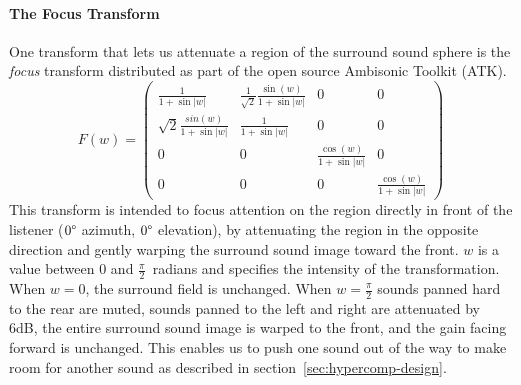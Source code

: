 \paragraph{The Focus Transform} One transform that lets us attenuate a
region of the surround sound sphere is the \textit{focus} transform
distributed as part of the open source Ambisonic Toolkit
(ATK).\cite{Anderson2009}
\begin{equation}
F(w)=\left( \begin{array}{cccc}
\frac{1}{1 + \sin|w|} & 
\frac{1}{\sqrt{2}} \frac{\sin(w)}{1 + \sin|w|}  & 
0 &
0 \\
\sqrt{2}\frac{sin(w)}{1 + \sin|w|} & %
\frac{1}{1 + \sin|w|} &                    %
0 & 
0 \\
0 & 
0 &
\frac{\cos(w)}{1 + \sin|w|} &
0 \\
0 &
0 &
0 &
\frac{\cos(w)}{1 + \sin|w|} 
\end{array} \right)
\label{eq:focus}
\end{equation}
This transform is intended to focus attention on the region directly
in front of the listener ($0\degree$ azimuth, $0\degree$ elevation),
by attenuating the region in the opposite direction and gently
warping the surround sound image toward the front. $w$ is a value
between $0$ and $\frac{\pi}{2}$~radians and specifies the intensity
of the transformation. When $w=0$, the surround field is
unchanged. When $w=\frac{\pi}{2}$ sounds panned hard to the rear are
muted, sounds panned to the left and right are attenuated by 6dB,
the entire surround sound image is warped to the front, and the gain facing
forward is unchanged. This enables us to push one sound out of the way
to make room for another sound as described in
section~\ref{sec:hypercomp-design}.

